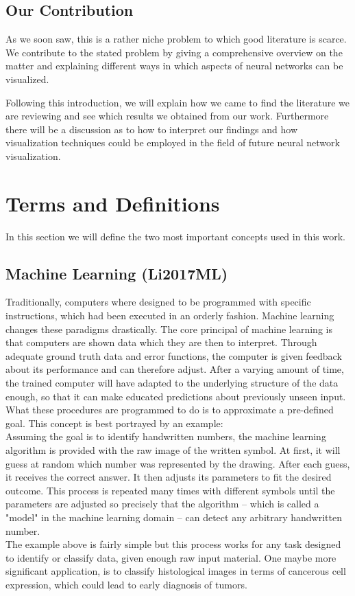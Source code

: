 \documentclass{acmsiggraph}               %
\begin{document}
\subsection{Our Contribution}
As we soon saw, this is a rather niche problem to which good literature is scarce. We contribute to the stated problem by giving a comprehensive overview on the matter and explaining different ways in which aspects of neural networks can be visualized.

Following this introduction, we will explain how we came to find the literature we are reviewing and see which results we obtained from our work. Furthermore there will be a discussion as to how to interpret our findings and how visualization techniques could be employed in the field of future neural network visualization.

\section{Terms and Definitions}
In this section we will define the two most important concepts used in this work.

\subsection{Machine Learning (Li2017ML)}
Traditionally, computers where designed to be programmed with specific instructions, which had been executed in an orderly fashion.
Machine learning changes these paradigms drastically. The core principal of machine learning is that computers are shown data which they are then to interpret. Through adequate ground truth data and error functions, the computer is given feedback about its performance and can therefore adjust. After a varying amount of time, the trained computer will have adapted to the underlying structure of the data enough, so that it can make educated predictions about previously unseen input. What these procedures are programmed to do is to approximate a pre-defined goal. This concept is best portrayed by an example:\\
Assuming the goal is to identify handwritten numbers, the machine learning algorithm is provided with the raw image of the written symbol. At first, it will guess at random which number was represented by the drawing. 
After each guess, it receives the correct answer. It then adjusts its parameters to fit the desired outcome.
This process is repeated many times with different symbols until the parameters are adjusted so precisely that the algorithm -- which is called a "model" in the machine learning domain -- can detect any arbitrary handwritten number.\\
The example above is fairly simple but this process works for any task designed to identify or classify data, given enough raw input material. One maybe more significant application, is to classify histological images in terms of cancerous cell expression, which could lead to early diagnosis of tumors.
\end{document}

